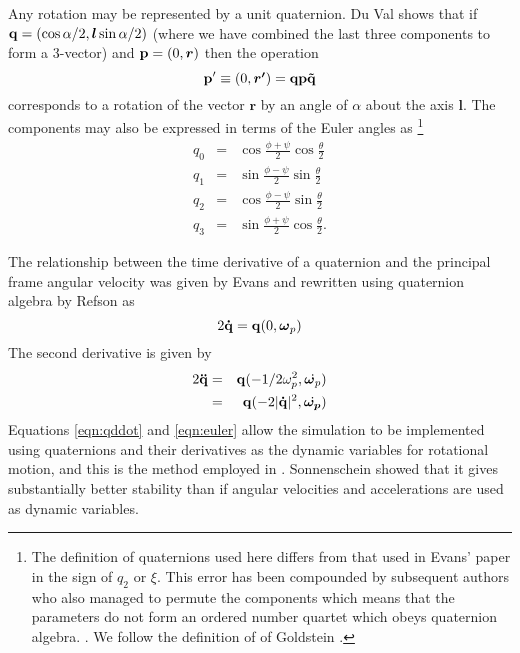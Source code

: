 Any rotation may be represented by a unit quaternion. Du Val shows
\cite{duval:64} that if $ {\bf q} = (\cos \alpha/2, \mbox{\boldmath \protect\(l\protect\)} \sin
\alpha/2) $ (where we have combined the last three components to form
a 3-vector) and ${\bf p} = (0,\mbox{\boldmath \protect\(r\protect\)})$ then the operation
\begin{equation}
{\bf p'} \equiv (0,\mbox{\boldmath \protect\(r'\protect\)}) = {\bf q p \tilde{q}}
\end{equation}
corresponds to a rotation of the vector $\bm{r}$ by an angle of
$\alpha$ about the axis $\bm{l}$.  The components may also be expressed in
terms of the Euler angles as
\footnote{The definition of quaternions used here differs from that used
in Evans' paper \cite[equation 21]{evans:77} in the sign of $q_2$ or
$\xi$.  This error has been compounded by subsequent authors
\cite{sonnenschein:85} who also managed to permute the components
which means that the parameters do not form an ordered number quartet
which obeys quaternion algebra.  .  We follow the definition of of
Goldstein \cite[pages 143 and 155]{goldstein:80}.} 
\begin{eqnarray}
q_0 & = & \cos \frac{\phi+\psi}{2} \cos \frac{\theta}{2} \nonumber \\
q_1 & = & \sin \frac{\phi-\psi}{2} \sin \frac{\theta}{2} \nonumber \\
q_2 & = & \cos \frac{\phi-\psi}{2} \sin \frac{\theta}{2} \nonumber \\
q_3 & = & \sin \frac{\phi+\psi}{2} \cos \frac{\theta}{2}.
\end{eqnarray}

The relationship between the time  derivative of a  quaternion and the
principal frame  angular velocity was  given  by Evans \cite{evans:77}
and rewritten using quaternion algebra by Refson \cite{refson:87} as
\begin{equation}
2 {\bf \dot{q}} = {\bf q}(0,\mbox{\boldmath \protect\(\omega\protect\)}_p)
\end{equation}
The second derivative is given by
\begin{eqnarray}
2{\bf \ddot{q}} & = & {\bf q}(- 1/2 \omega_p^2,\dot{\mbox{\boldmath \protect\(\omega\protect\)}_p}) \\
 & = & {\bf q}(-2 |{\bf \dot{q}}|^2,\dot{\mbox{\boldmath \protect\(\omega_p\protect\)}}) \label{eqn:qddot}
\end{eqnarray}
Equations \ref{eqn:qddot} and \ref{eqn:euler} allow the simulation to
be implemented using quaternions and their derivatives as the dynamic
variables for rotational motion, and this is the method employed in
\moldy.  Sonnenschein showed\cite{sonnenschein:85} that it gives
substantially better stability than if angular velocities and
accelerations are used as dynamic variables.
 
